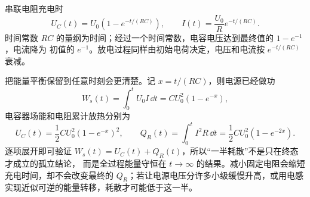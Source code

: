 串联电阻充电时
\begin{equation}
 U_C(t)=U_0\left(1-e^{-t/(RC)}\right),
 \qquad
 I(t)=\frac{U_0}{R}e^{-t/(RC)}.
\end{equation}
时间常数 $RC$ 的量纲为时间；经过一个时间常数，电容电压达到最终值的 $1-e^{-1}$，电流降为
初值的 $e^{-1}$。放电过程同样由初始电荷决定，电压和电流按 $e^{-t/(RC)}$ 衰减。

把能量平衡保留到任意时刻会更清楚。记 $x=t/(RC)$，则电源已经做功
\begin{equation}
 W_s(t)=\int_0^t U_0I\,\dd t
 =CU_0^2(1-e^{-x}),
\end{equation}
电容器场能和电阻累计放热分别为
\begin{equation}
 U_C(t)=\frac12CU_0^2(1-e^{-x})^2,
 \qquad
 Q_R(t)=\int_0^t I^2R\,\dd t
 =\frac12CU_0^2(1-e^{-2x}).
\end{equation}
逐项展开即可验证 $W_s(t)=U_C(t)+Q_R(t)$，所以“一半耗散”不是只在终态才成立的孤立结论，
而是全过程能量守恒在 $t\to\infty$ 的结果。减小固定电阻会缩短充电时间，却不会改变最终的
$Q_R$；若让电源电压分许多小级缓慢升高，或用电感实现近似可逆的能量转移，耗散才可能低于这一半。
